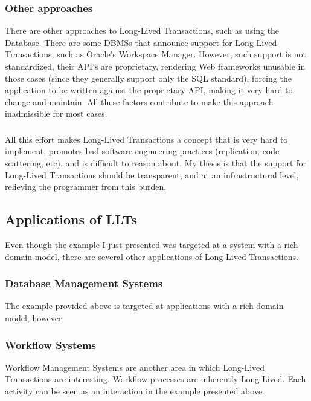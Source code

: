 \documentclass{llncs}
\begin{document}
\subsubsection{Other approaches}

There are other approaches to Long-Lived Transactions, such as using
the Database. There are some DBMSs that announce support for
Long-Lived Transactions, such as Oracle's Workspace Manager. However,
such support is not standardized, their API's are proprietary,
rendering Web frameworks unusable in those cases (since they generally 
support only the SQL standard), forcing the application to be written
against the proprietary API, making it very hard to change and
maintain. All these factors contribute to make this approach inadmissible for
most cases.

\subsubsection{}

All this effort makes Long-Lived Transactions a concept that is very
hard to implement, promotes bad software engineering practices
(replication, code scattering, etc), and is
difficult to reason about. My thesis is that the support for
Long-Lived Transactions should be transparent, and at an
infrastructural level, relieving the programmer from this burden.

\subsection{Applications of LLTs}

Even though the example I just presented was targeted at a system with
a rich domain model, there are several other applications of
Long-Lived Transactions.

\subsubsection{Database Management Systems}

The example provided above is targeted at applications with a rich
domain model, however 

\subsubsection{Workflow Systems}

Workflow Management Systems are another area in which Long-Lived
Transactions are interesting. Workflow processes are inherently
Long-Lived. Each activity can be seen as an interaction in the example
presented above.
\end{document}
